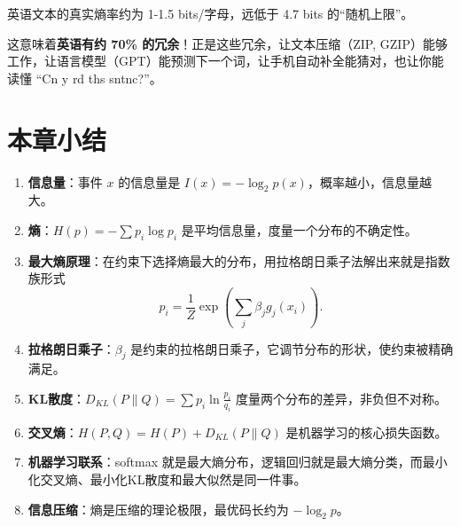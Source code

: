 \begin{insightbox}
英语文本的真实熵率约为 1-1.5 bits/字母，远低于 4.7 bits 的“随机上限”。

这意味着\textbf{英语有约 70\% 的冗余}！正是这些冗余，让文本压缩（ZIP, GZIP）能够工作，让语言模型（GPT）能预测下一个词，让手机自动补全能猜对，也让你能读懂 “Cn y rd ths sntnc?”。
\end{insightbox}
\section{本章小结}

\begin{enumerate}
    \item \textbf{信息量}：事件 $x$ 的信息量是 $I(x) = -\log_2 p(x)$，概率越小，信息量越大。

    \item \textbf{熵}：$H(p) = -\sum p_i \log p_i$ 是平均信息量，度量一个分布的不确定性。

    \item \textbf{最大熵原理}：在约束下选择熵最大的分布，用拉格朗日乘子法解出来就是指数族形式
    \[
    p_i = \frac{1}{Z} \exp\left( \sum_j \beta_j g_j(x_i) \right) .
    \]

    \item \textbf{拉格朗日乘子}：$\beta_j$ 是约束的拉格朗日乘子，它调节分布的形状，使约束被精确满足。

    \item \textbf{KL散度}：$D_{KL}(P \| Q) = \sum p_i \ln \frac{p_i}{q_i}$ 度量两个分布的差异，非负但不对称。

    \item \textbf{交叉熵}：$H(P, Q) = H(P) + D_{KL}(P \| Q)$ 是机器学习的核心损失函数。

    \item \textbf{机器学习联系}：softmax 就是最大熵分布，逻辑回归就是最大熵分类，而最小化交叉熵、最小化KL散度和最大似然是同一件事。

    \item \textbf{信息压缩}：熵是压缩的理论极限，最优码长约为 $-\log_2 p$。
\end{enumerate}

